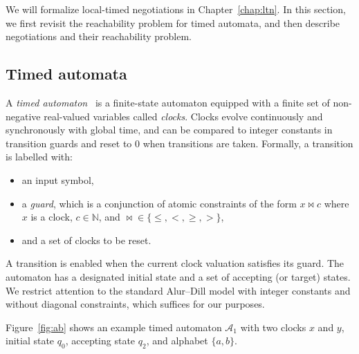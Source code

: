 We will formalize local-timed negotiations in Chapter~\ref{chap:ltn}. In this section, we first revisit the reachability problem for timed automata, and then describe negotiations and their reachability problem.

\subsection{Timed automata}
\label{subsec:ta-reachability}

A \emph{timed automaton}~\cite{AlurDillTA} is a finite-state automaton equipped with a finite set of non-negative real-valued variables called \emph{clocks}. Clocks evolve continuously and synchronously with global time, and can be compared to integer constants in transition guards and reset to \(0\) when transitions are taken. Formally, a transition is labelled with:
\begin{itemize}
  \item an input symbol,
  \item a \emph{guard}, which is a conjunction of atomic constraints of the form \(x \bowtie c\) where \(x\) is a clock, \(c \in \mathbb{N}\), and \(\bowtie \in \{\le,<,\ge,>\}\),
  \item and a set of clocks to be reset.
\end{itemize}
A transition is enabled when the current clock valuation satisfies its guard. The automaton has a designated initial state and a set of accepting (or target) states. We restrict attention to the standard Alur–Dill model with integer constants and without diagonal constraints, which suffices for our purposes.

Figure~\ref{fig:ab} shows an example timed automaton \(\mathcal{A}_1\) with two clocks \(x\) and \(y\), initial state \(q_0\), accepting state \(q_2\), and alphabet \(\{a,b\}\).


